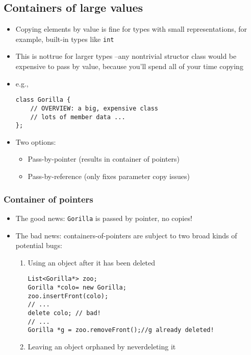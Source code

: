 \subsection{Containers of large values}
\begin{itemize}
	\item Copying elements by value is fine for types with small representations, for example, built-in types like \lstinline[style=C++]{int}
	\item This is nottrue for larger types –any nontrivial structor class would be expensive to pass by value, because you'll spend all of your time copying
	\item e.g.,
\begin{lstlisting}[style=C++]
class Gorilla {
	// OVERVIEW: a big, expensive class
	// lots of member data ...
};\end{lstlisting}
	\item Two options:
	\begin{itemize}
		\item Pass-by-pointer (results in container of pointers)
		\item Pass-by-reference (only fixes parameter copy issues)
	\end{itemize}
\end{itemize}

\subsubsection{Container of pointers}
\begin{itemize}
	\item The good news: \lstinline[style=C++]{Gorilla} is passed by pointer, no copies!
	\item The bad news: containers-of-pointers are subject to two broad kinds of potential bugs:
	\begin{enumerate}
		\item Using an object after it has been deleted
\begin{lstlisting}[style=C++]
List<Gorilla*> zoo;
Gorilla *colo= new Gorilla;
zoo.insertFront(colo);
// ...
delete colo; // bad!
// ...
Gorilla *g = zoo.removeFront();//g already deleted!
\end{lstlisting}
		\item Leaving an object orphaned by neverdeleting it
	\end{enumerate}
\end{itemize}

